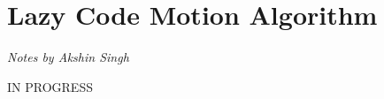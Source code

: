 \section{Lazy Code Motion Algorithm}
\begin{flushright}
\textit{Notes by Akshin Singh}
\end{flushright}

IN PROGRESS